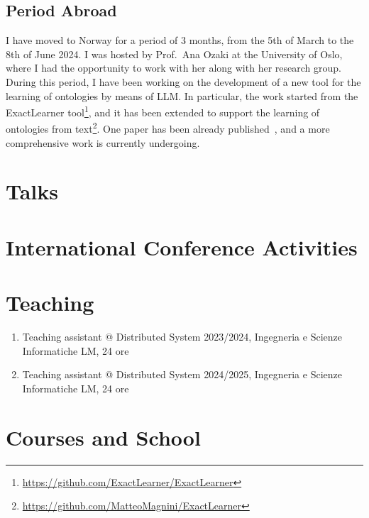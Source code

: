 \documentclass[11pt]{article}
\begin{document}
\subsection{Period Abroad}
I have moved to Norway for a period of 3 months, from the 5th of March to the 8th of June 2024.
%
I was hosted by Prof.~Ana Ozaki at the University of Oslo, where I had the opportunity to work with her along with her research group.
%
During this period, I have been working on the development of a new tool for the learning of ontologies by means of \ac{LLM}.
%
In particular, the work started from the ExactLearner tool\footnote{\url{https://github.com/ExactLearner/ExactLearner}}, and it has been extended to support the learning of ontologies from text\footnote{\url{https://github.com/MatteoMagnini/ExactLearner}}.
%
One paper has been already published~\cite{DBLP:conf/dlog/MagniniOS24}, and a more comprehensive work is currently undergoing.


\section{Talks}


\section{International Conference Activities}


\section{Teaching}
\begin{enumerate}
	\item Teaching assistant @ Distributed System 2023/2024, Ingegneria e Scienze Informatiche LM, 24 ore
	\item Teaching assistant @ Distributed System 2024/2025, Ingegneria e Scienze Informatiche LM, 24 ore
\end{enumerate}


\section{Courses and School}
\end{document}
